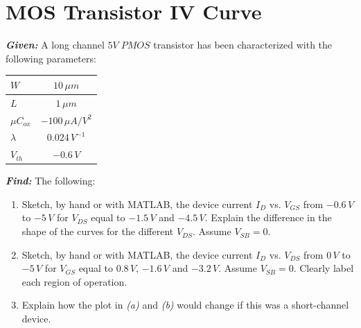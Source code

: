 \documentclass[12pt, fleqn]{article}
\begin{document}
\section{MOS Transistor IV Curve}
\textbf{\emph{Given: }} A long channel $5V\;PMOS$ transistor has been characterized with the following parameters:
    \begin{table}[H]
    \centering
    \setlength{\tabcolsep}{20pt}
    \renewcommand{\arraystretch}{1.5}
        \begin{tabular}{|l|c|}
            \hline
            $W$ & $10\,\mu m$\\
            \hline
            $L$ & $1\,\mu m$\\
            \hline
            $\mu C_{ox}$ & $-100\,\mu A/V^2$\\
            \hline
            $\lambda$ & $0.024\,V^{-1}$\\
            \hline
            $V_{th}$ & $-0.6\,V$\\
            \hline
        \end{tabular}
    \label{tab:pmos}
    \end{table}

\noindent
\textbf{\emph{Find: }} The following:

\begin{enumerate}[label=(\alph*)]
    \item{Sketch, by hand or with MATLAB, the device current $I_D$ vs. $V_{GS}$ from $-0.6\,V$ to $-5\,V$ for $V_{DS}$ equal to $-1.5\,V$ and $-4.5\,V$. Explain the difference in the shape of the curves for the different $V_{DS}$.  Assume $V_{SB} = 0$.}
    \item{Sketch, by hand or with MATLAB, the device current $I_D$ vs. $V_{DS}$ from $0\,V$ to $-5\,V$ for $V_{GS}$ equal to $0.8\,V$, $-1.6\,V$ and $-3.2\,V$. Assume $V_{SB} = 0$.  Clearly label each region of operation.}
    \item{Explain how the plot in \textit{(a)} and \textit{(b)} would change if this was a short-channel device.}
\end{enumerate}
\end{document}
